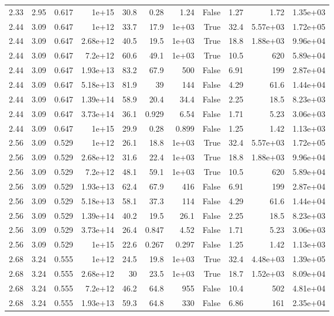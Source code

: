 \begin{table}
\begin{tabular}{rrrrrrrrrrr}
2.33 & 2.95 & 0.617 & 1e+15 & 30.8 & 0.28 & 1.24 & False & 1.27 & 1.72 & 1.35e+03 \\
2.44 & 3.09 & 0.647 & 1e+12 & 33.7 & 17.9 & 1e+03 & True & 32.4 & 5.57e+03 & 1.72e+05 \\
2.44 & 3.09 & 0.647 & 2.68e+12 & 40.5 & 19.5 & 1e+03 & True & 18.8 & 1.88e+03 & 9.96e+04 \\
2.44 & 3.09 & 0.647 & 7.2e+12 & 60.6 & 49.1 & 1e+03 & True & 10.5 & 620 & 5.89e+04 \\
2.44 & 3.09 & 0.647 & 1.93e+13 & 83.2 & 67.9 & 500 & False & 6.91 & 199 & 2.87e+04 \\
2.44 & 3.09 & 0.647 & 5.18e+13 & 81.9 & 39 & 144 & False & 4.29 & 61.6 & 1.44e+04 \\
2.44 & 3.09 & 0.647 & 1.39e+14 & 58.9 & 20.4 & 34.4 & False & 2.25 & 18.5 & 8.23e+03 \\
2.44 & 3.09 & 0.647 & 3.73e+14 & 36.1 & 0.929 & 6.54 & False & 1.71 & 5.23 & 3.06e+03 \\
2.44 & 3.09 & 0.647 & 1e+15 & 29.9 & 0.28 & 0.899 & False & 1.25 & 1.42 & 1.13e+03 \\
2.56 & 3.09 & 0.529 & 1e+12 & 26.1 & 18.8 & 1e+03 & True & 32.4 & 5.57e+03 & 1.72e+05 \\
2.56 & 3.09 & 0.529 & 2.68e+12 & 31.6 & 22.4 & 1e+03 & True & 18.8 & 1.88e+03 & 9.96e+04 \\
2.56 & 3.09 & 0.529 & 7.2e+12 & 48.1 & 59.1 & 1e+03 & True & 10.5 & 620 & 5.89e+04 \\
2.56 & 3.09 & 0.529 & 1.93e+13 & 62.4 & 67.9 & 416 & False & 6.91 & 199 & 2.87e+04 \\
2.56 & 3.09 & 0.529 & 5.18e+13 & 58.1 & 37.3 & 114 & False & 4.29 & 61.6 & 1.44e+04 \\
2.56 & 3.09 & 0.529 & 1.39e+14 & 40.2 & 19.5 & 26.1 & False & 2.25 & 18.5 & 8.23e+03 \\
2.56 & 3.09 & 0.529 & 3.73e+14 & 26.4 & 0.847 & 4.52 & False & 1.71 & 5.23 & 3.06e+03 \\
2.56 & 3.09 & 0.529 & 1e+15 & 22.6 & 0.267 & 0.297 & False & 1.25 & 1.42 & 1.13e+03 \\
2.68 & 3.24 & 0.555 & 1e+12 & 24.5 & 19.8 & 1e+03 & True & 32.4 & 4.48e+03 & 1.39e+05 \\
2.68 & 3.24 & 0.555 & 2.68e+12 & 30 & 23.5 & 1e+03 & True & 18.7 & 1.52e+03 & 8.09e+04 \\
2.68 & 3.24 & 0.555 & 7.2e+12 & 46.2 & 64.8 & 955 & False & 10.4 & 502 & 4.81e+04 \\
2.68 & 3.24 & 0.555 & 1.93e+13 & 59.3 & 64.8 & 330 & False & 6.86 & 161 & 2.35e+04 \\

\end{tabular}
\end{table}
